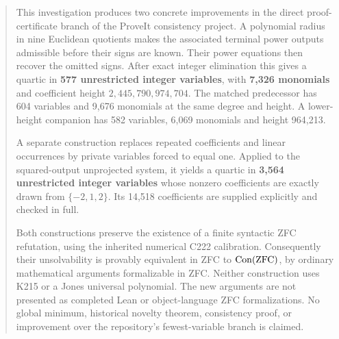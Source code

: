 \begin{abstract}
This investigation produces two concrete improvements in the direct proof-certificate branch of the ProveIt consistency project. A polynomial radius in nine Euclidean quotients makes the associated terminal power outputs admissible before their signs are known. Their power equations then recover the omitted signs. After exact integer elimination this gives a quartic in \textbf{577 unrestricted integer variables}, with \textbf{7,326 monomials} and coefficient height \(2,445,790,974,704\). The matched predecessor has 604 variables and 9,676 monomials at the same degree and height. A lower-height companion has 582 variables, 6,069 monomials and height 964,213.

A separate construction replaces repeated coefficients and linear occurrences by private variables forced to equal one. Applied to the squared-output unprojected system, it yields a quartic in \textbf{3,564 unrestricted integer variables} whose nonzero coefficients are exactly drawn from \(\{-2,1,2\}\). Its 14,518 coefficients are supplied explicitly and checked in full.

Both constructions preserve the existence of a finite syntactic ZFC refutation, using the inherited numerical C222 calibration. Consequently their unsolvability is provably equivalent in ZFC to \(\Con(\mathrm{ZFC})\), by ordinary mathematical arguments formalizable in ZFC. Neither construction uses K215 or a Jones universal polynomial. The new arguments are not presented as completed Lean or object-language ZFC formalizations. No global minimum, historical novelty theorem, consistency proof, or improvement over the repository's fewest-variable branch is claimed.
\end{abstract}
